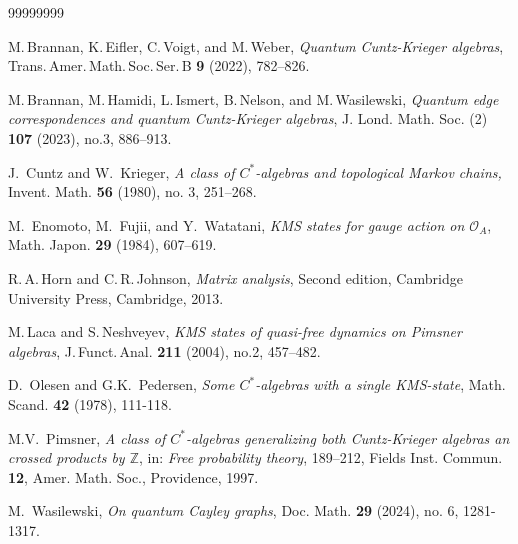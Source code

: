 \documentclass[a4paper,reqno]{amsart}
\numberwithin{equation}{section}
\numberwithin{theorem}{section}
\theoremstyle{definition}\newtheorem{definition}[theorem]{Definition}
\theoremstyle{definition}\newtheorem{remark}[theorem]{Remark}
\theoremstyle{definition}\newtheorem{example}[theorem]{Example}
\theoremstyle{definition}\newtheorem*{notation*}{Notation}
\theoremstyle{definition}\newtheorem*{convention*}{Convention}
\theoremstyle{definition}\newtheorem{observation}{Observation}
\theoremstyle{definition}\newtheorem*{acknowledgment*}{Acknowledgments}
\begin{document}
\begin{thebibliography}{99999999}


M.\,Brannan, K.\,Eifler, C.\,Voigt, and M.\,Weber, 
{\em Quantum Cuntz-Krieger algebras}, 
Trans.\,Amer.\,Math.\,Soc.\,Ser.\,B \textbf{9} (2022), 782–826.

 M.\,Brannan, M.\,Hamidi,  L.\,Ismert, B.\,Nelson,  and M.\,Wasilewski, 
{\em Quantum edge correspondences and quantum Cuntz-Krieger algebras}, 
J. Lond. Math. Soc. (2) \textbf{107} (2023), no.3, 886–913.

J.~Cuntz and W.~Krieger,
\emph{A class of $C^*$-algebras and topological Markov chains,}
Invent. Math.   \textbf{56} (1980), no. 3, 251–268.

 M.~Enomoto, M.~Fujii, and Y.~Watatani, \emph{KMS states for gauge action on $\mathcal{O}_{A}$}, Math. Japon. \textbf{29} (1984), 607–619.


R.\,A.\,Horn and C.\,R.\,Johnson, {\em Matrix analysis},
Second edition,
Cambridge University Press, Cambridge, 2013. 


M.\,Laca and S.\,Neshveyev, {\em KMS states of quasi-free dynamics on Pimsner algebras}, 
J.\,Funct.\,Anal. \textbf{211} (2004), no.2, 457–482.

 D.~Olesen and G.K.~Pedersen, \emph{Some $C^{\ast}$-algebras with a single KMS-state}, Math. Scand. \textbf{42} (1978), 111-118.

 M.V.~Pimsner, \emph{A class of $C^{\ast}$-algebras generalizing both Cuntz-Krieger algebras an crossed products by $\mathbb{Z}$}, in: \emph{Free probability theory}, 189–212, Fields Inst. Commun. \textbf{12}, Amer. Math. Soc., Providence, 1997.


 M.~Wasilewski, \emph{On quantum Cayley graphs}, Doc. Math. \textbf{29} (2024), no. 6, 1281-1317.
\end{thebibliography}
\end{document}
